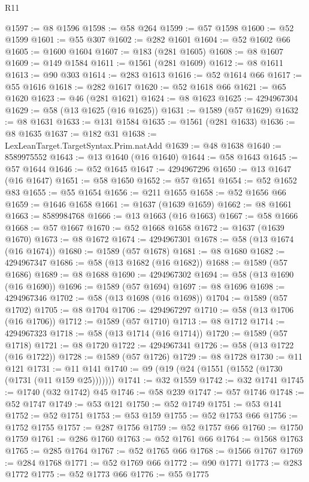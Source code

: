 \begin{lexlean}{R11}
\begin{coremodule}
@1597 := @8 @1596
@1598 := @58 @264
@1599 := @57 @1598
@1600 := @52 @1599
@1601 := @55 @307
@1602 := @282 @1601
@1604 := @52 @1602 @66
@1605 := @1600 @1604
@1607 := @183 (@281 @1605)
@1608 := @8 @1607
@1609 := @149 @1584
@1611 := @1561 (@281 @1609)
@1612 := @8 @1611
@1613 := @90 @303
@1614 := @283 @1613
@1616 := @52 @1614 @66
@1617 := @55 @1616
@1618 := @282 @1617
@1620 := @52 @1618 @66
@1621 := @65 @1620
@1623 := @46 (@281 @1621)
@1624 := @8 @1623
@1625 := 4294967304
@1629 := @58 (@13 @1625 (@16 @1625))
@1631 := @1589 (@57 @1629)
@1632 := @8 @1631
@1633 := @131 @1584
@1635 := @1561 (@281 @1633)
@1636 := @8 @1635
@1637 := @182 @31
@1638 := LexLeanTarget.TargetSyntax.Prim.natAdd
@1639 := @48 @1638
@1640 := 8589975552
@1643 := @13 @1640 (@16 @1640)
@1644 := @58 @1643
@1645 := @57 @1644
@1646 := @52 @1645
@1647 := 4294967296
@1650 := @13 @1647 (@16 @1647)
@1651 := @58 @1650
@1652 := @57 @1651
@1654 := @52 @1652 @83
@1655 := @55 @1654
@1656 := @211 @1655
@1658 := @52 @1656 @66
@1659 := @1646 @1658
@1661 := @1637 (@1639 @1659)
@1662 := @8 @1661
@1663 := 8589984768
@1666 := @13 @1663 (@16 @1663)
@1667 := @58 @1666
@1668 := @57 @1667
@1670 := @52 @1668 @1658
@1672 := @1637 (@1639 @1670)
@1673 := @8 @1672
@1674 := 4294967301
@1678 := @58 (@13 @1674 (@16 @1674))
@1680 := @1589 (@57 @1678)
@1681 := @8 @1680
@1682 := 4294967347
@1686 := @58 (@13 @1682 (@16 @1682))
@1688 := @1589 (@57 @1686)
@1689 := @8 @1688
@1690 := 4294967302
@1694 := @58 (@13 @1690 (@16 @1690))
@1696 := @1589 (@57 @1694)
@1697 := @8 @1696
@1698 := 4294967346
@1702 := @58 (@13 @1698 (@16 @1698))
@1704 := @1589 (@57 @1702)
@1705 := @8 @1704
@1706 := 4294967297
@1710 := @58 (@13 @1706 (@16 @1706))
@1712 := @1589 (@57 @1710)
@1713 := @8 @1712
@1714 := 4294967323
@1718 := @58 (@13 @1714 (@16 @1714))
@1720 := @1589 (@57 @1718)
@1721 := @8 @1720
@1722 := 4294967341
@1726 := @58 (@13 @1722 (@16 @1722))
@1728 := @1589 (@57 @1726)
@1729 := @8 @1728
@1730 := @11 @121
@1731 := @11 @141
@1740 := @9 (@19 (@24 (@1551 (@1552 (@1730 (@1731 (@11 @159 @25)))))))
@1741 := @32 @1559
@1742 := @32 @1741
@1745 := @1740 (@32 @1742) @45
@1746 := @58 @239
@1747 := @57 @1746
@1748 := @52 @1747
@1749 := @53 @121
@1750 := @52 @1749
@1751 := @53 @141
@1752 := @52 @1751
@1753 := @53 @159
@1755 := @52 @1753 @66
@1756 := @1752 @1755
@1757 := @287 @1756
@1759 := @52 @1757 @66
@1760 := @1750 @1759
@1761 := @286 @1760
@1763 := @52 @1761 @66
@1764 := @1568 @1763
@1765 := @285 @1764
@1767 := @52 @1765 @66
@1768 := @1566 @1767
@1769 := @284 @1768
@1771 := @52 @1769 @66
@1772 := @90 @1771
@1773 := @283 @1772
@1775 := @52 @1773 @66
@1776 := @55 @1775

\end{coremodule}
\end{lexlean}
